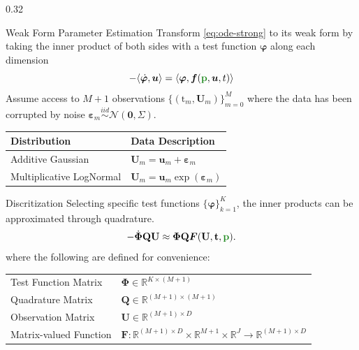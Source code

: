 \documentclass{rummelPoster}
\newcommand{\colwidth}{0.32\linewidth}
\newcommand{\R}{\mathbb{R}} %
\newcommand{\N}{\mathcal{N}} %
\newcommand{\p}{{\color{ForestGreen}\mathbf{p}}}
\renewcommand{\u}{\boldsymbol{u}}
\renewcommand{\t}{t}
\newcommand{\noise}{\boldsymbol{\varepsilon}}
\newcommand{\testFun}{\boldsymbol{\varphi}}
\newcommand{\f}{\boldsymbol{f}}
\newcommand{\F}{\boldsymbol{F}}
\newcommand{\udisc}{\mathbf{u}}
\newcommand{\Udisc}{\mathbf{U}}
\newcommand{\tdisc}{\mathbf{t}}
\newcommand{\TestFundisc}{\boldsymbol{\Phi}}
\newcommand{\Q}{\mathbf{Q}}
\begin{document}
\begin{frame}{}
\begin{columns}[t]
\begin{column}{\colwidth}
\begin{block}{Weak Form Parameter Estimation}
    Transform \cref{eq:ode-strong} to its \alert{weak form} by taking the inner product of both sides with a test function $\testFun$ along each dimension
    \begin{equation} \label{eq:ode-weak}
        -\langle \dot{\testFun}, \u\rangle = \langle \testFun, \f(\p, \u, \t)\rangle%
    \end{equation}
    \normalfont
    Assume access to $M+1$ observations
        $\{(\mathrm{t}_m, \Udisc_m)\}_{m=0}^M$
    where the data has been corrupted by noise $\noise_m \stackrel{iid}{\sim} \N(\mathbf{0},\Sigma)$.
    \begin{table}
    \begin{tabular}{ll}
        \textbf{Distribution} & \textbf{Data Description}\\
        \midrule
        Additive Gaussian & $\Udisc_m = \udisc_m + \noise_m$ \\
        Multiplicative LogNormal & $\Udisc_m = \udisc_m \exp(\noise_m)$
    \end{tabular}
    \end{table}
\end{block}

\begin{block}{Discritization}
    Selecting specific test functions $\{\testFun\}_{k=1}^K$, the inner products can be approximated through quadrature.
    \begin{equation}\label{eq:weakFormDisc}
        - \dot{\TestFundisc} \Q \Udisc \approx \TestFundisc \Q \F(\Udisc,\tdisc,\p) .
    \end{equation}
    \normalfont
    where the following are defined for convenience:
    \begin{table}
    \begin{tabular}{ll}
        Test Function Matrix & $\TestFundisc \in \R^{K\times (M+1)}$ \\
        Quadrature Matrix &$\Q\in \R^{(M+1)\times (M+1)}$\\
        Observation Matrix & $\Udisc \in \R^{(M+1)\times D}$ \\
        Matrix-valued Function & $\F: \R^{(M+1)\times D}\times \R^{M+1} \times \R^J \rightarrow \R^{(M+1)\times D}$ 
    \end{tabular}
    \end{table}
    \normalfont
    \vspace{-.2cm}
\end{block}
\end{column}


\end{columns}
\end{frame}
\end{document}
